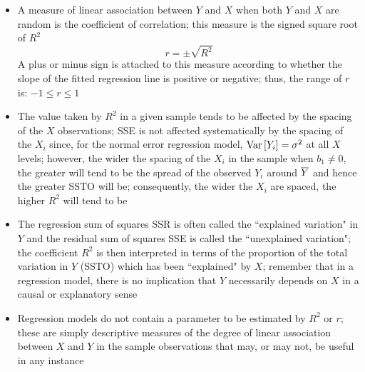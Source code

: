 \begin{itemize}
\item A measure of linear association between $Y$ and $X$ when both $Y$ and $X$ are random is the coefficient of correlation; this measure is the signed square root of $R^2$ $$ r = \pm \sqrt{R^2} $$ 
A plus or minus sign is attached to this measure according to whether the slope of the fitted regression line is positive or negative; thus, the range of $r$ is: $-1 \leq r \leq 1$
\item The value taken by $R^2$ in a given sample tends to be affected by the spacing of the $X$ observations; SSE is not affected systematically by the spacing of the $X_i$ since, for the normal error regression model, $\mathrm{Var}\left[ Y_i \right] = \sigma^2$ at all $X$ levels; however, the wider the spacing of the $X_i$ in the sample when $b_1 \neq 0$, the greater will tend to be the spread of the observed $Y_i$ around $\overline{Y}$ and hence the greater SSTO will be; consequently, the wider the $X_i$ are spaced, the higher $R^2$ will tend to be
\item The regression sum of squares SSR is often called the ``explained variation" in $Y$ and the residual sum of squares SSE is called the ``unexplained variation"; the coefficient $R^2$ is then interpreted in terms of the proportion of the total variation in $Y$ (SSTO) which has been ``explained" by $X$; remember that in a regression model, there is no implication that $Y$ necessarily depends on $X$ in a causal or explanatory sense
\item Regression models do not contain a parameter to be estimated by $R^2$ or $r$; these are simply descriptive measures of the degree of linear association between $X$ and $Y$ in the sample observations that may, or may not, be useful in any instance
\end{itemize}

